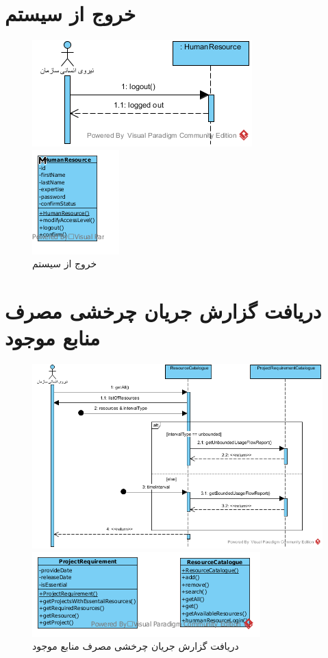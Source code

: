 \section{خروج از سیستم}
\begin{figure}[H]
	\centering
	\includegraphics[scale=1]{img/sequence-analysis/SignOut}
	
	
	\includegraphics[scale=1]{img/sequence-analysis/SignOutC}
	\caption{خروج از سیستم}
\end{figure}


\section{دریافت گزارش جریان چرخشی مصرف منابع موجود}
\begin{figure}[H]
	\centering
	\includegraphics[scale=0.7]{img/sequence-analysis/UsageFlowReport}
	
	
	\includegraphics[scale=0.7]{img/sequence-analysis/UsageFlowReportC}
	\caption{دریافت گزارش جریان چرخشی مصرف منابع موجود}
\end{figure}

